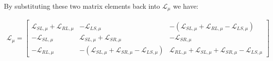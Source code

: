 By substituting these two matrix elements back into $\boldsymbol{\mathcal{L}}_{\mu}$ we have:
\begin{widetext}
\begin{align*}
\boldsymbol{\mathcal{L}}_{\mu}=
\begin{bmatrix}
\mathcal{L}_{SL,\mu}+\mathcal{L}_{RL,\mu} 
& 
-\mathcal{L}_{LS,\mu} 
& 
-(\mathcal{L}_{SL,\mu}+\mathcal{L}_{RL,\mu}-\mathcal{L}_{LS,\mu})
\\
-\mathcal{L}_{SL,\mu} 
&
\mathcal{L}_{SL,\mu}+\mathcal{L}_{SR,\mu} 
&
-\mathcal{L}_{SR,\mu}
\\
-\mathcal{L}_{RL,\mu} 
& 
-(\mathcal{L}_{SL,\mu}+\mathcal{L}_{SR,\mu}-\mathcal{L}_{LS,\mu})
& 
\mathcal{L}_{RL,\mu}+\mathcal{L}_{SL,\mu}+\mathcal{L}_{SR,\mu}-\mathcal{L}_{LS,\mu}
\end{bmatrix}
\end{align*}
\end{widetext}
~
\clearpage